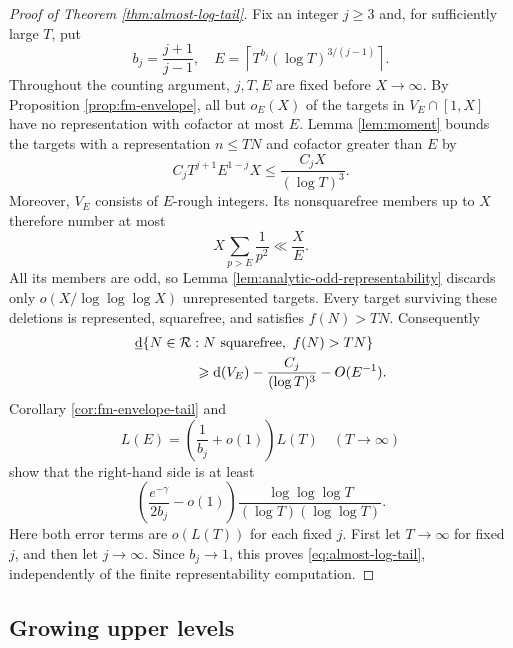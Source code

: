 \documentclass[11pt,letterpaper,reqno]{amsart}
\numberwithin{equation}{section}
\theoremstyle{remark}
\newcommand{\Rcal}{\mathcal{R}}
\newcommand{\1}{\mathbf 1}
\newcommand{\lowerdens}{\underline{\textup{d}}}
\renewcommand{\leq}{\leqslant}
\renewcommand{\geq}{\geqslant}
\begin{document}
\begin{proof}[Proof of Theorem \ref{thm:almost-log-tail}]
Fix an integer $j\geq3$ and, for sufficiently large $T$, put
\[
 b_j=\frac{j+1}{j-1},\quad
 E=\left\lceil T^{b_j}(\log T)^{3/(j-1)}\right\rceil.
\]
Throughout the counting argument, $j,T,E$ are fixed before $X\to\infty$.
By Proposition \ref{prop:fm-envelope}, all but $o_E(X)$ of the targets in
$V_E\cap[1,X]$ have no representation with cofactor at most $E$.
Lemma \ref{lem:moment} bounds the targets with a representation
$n\leq TN$ and cofactor greater than $E$ by
\[
 C_jT^{j+1}E^{1-j}X\leq\frac{C_jX}{(\log T)^3}.
\]
Moreover, $V_E$ consists of $E$-rough integers. Its nonsquarefree members
up to $X$ therefore number at most
\[
 X\sum_{p>E}\frac1{p^2}\ll\frac XE.
\]
All its members are odd, so Lemma \ref{lem:analytic-odd-representability}
discards only $o(X/\log\log\log X)$ unrepresented targets. Every target surviving
these deletions is represented, squarefree, and satisfies $f(N)>TN$.
Consequently
\begin{align*}
 &\lowerdens\{N\in\Rcal:N\text{ squarefree},\ f(N)>TN\}\\
 &\hspace{15mm}\geq \textup{d}(V_E)-\frac{C_j}{(\log T)^3}-O(E^{-1}).
\end{align*}
Corollary \ref{cor:fm-envelope-tail} and
\[
 L(E)=\left(\frac1{b_j}+o(1)\right)L(T)
 \quad(T\to\infty)
\]
show that the right-hand side is at least
\[
 \left(\frac{e^{-\gamma}}{2b_j}-o(1)\right)
 \frac{\log\log\log T}{(\log T)(\log\log T)}.
\]
Here both error terms are $o(L(T))$ for each fixed $j$. First let
$T\to\infty$ for fixed $j$, and then let $j\to\infty$. Since $b_j\to1$,
this proves \eqref{eq:almost-log-tail}, independently of the finite
representability computation.
\end{proof}

\subsection{Growing upper levels}
\end{document}
